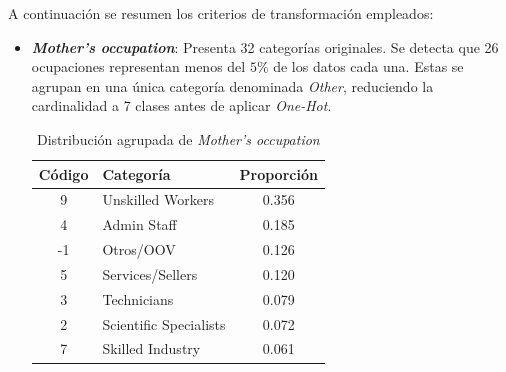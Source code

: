 \documentclass{report}[14pt]
\begin{document}
A continuación se resumen los criterios de transformación empleados:

\begin{itemize}
    \item \textbf{\textit{Mother's occupation}}: Presenta 32 categorías originales. Se detecta que 26 ocupaciones representan menos del $5\%$ de los datos cada una. Estas se agrupan en una única categoría denominada \textit{Other}, reduciendo la cardinalidad a 7 clases antes de aplicar \textit{One-Hot}.
    \begin{table}[H]
    \centering
    \begin{tabular}{|c|l|c|}
        \hline
        \textbf{Código} & \textbf{Categoría} & \textbf{Proporción} \\
        \hline
        9  & Unskilled Workers     & 0.356 \\
        4  & Admin Staff           & 0.185 \\
        -1 & Otros/OOV             & 0.126 \\
        5  & Services/Sellers      & 0.120 \\
        3  & Technicians           & 0.079 \\
        2  & Scientific Specialists & 0.072 \\
        7  & Skilled Industry      & 0.061 \\
        \hline
    \end{tabular}
    \caption{Distribución agrupada de \textit{Mother's occupation}}
    \label{tab:mother_occ}
    \end{table}
    

\end{itemize}
\end{document}
